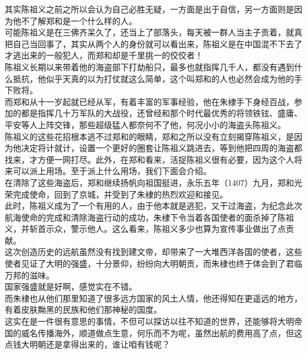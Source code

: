 \begin{multicols}{\theparacolNo}
其实陈祖义之前之所以会认为自己必胜无疑，一方面是出于自信，另一方面则是因为他不了解郑和是一个什么样的人。\\

可能陈祖义是在三佛齐呆久了，还当上了部落头，每天被一群人当主子贡着，就真把自己当回事了，其实从两个人的身份就可以看出来，陈祖义是在中国混不下去了才逃出来的一般犯人，而郑和却是千里挑一的佼佼者！\\

陈祖义长期以来带着他的海盗部下打劫船只，最多也就指挥几千人，都没有遇到什么抵抗，他似乎天真的以为打仗就这么简单，这个叫郑和的人也必然会成为他的手下败将。\\

而郑和从十一岁起就已经从军，有着丰富的军事经验，他在朱棣手下身经百战，参加的都是指挥几十万军队的大战役，还曾经和那个时代最优秀的将领铁铉、盛庸、平安等人上阵交锋，那些超级猛人都奈何不了他，何况小小的海盗头陈祖义。\\

陈祖义的这些花招根本逃不过郑和的眼睛，郑和之所以没有立刻揭穿陈祖义，是因为他决定将计就计，设置一个更好的圈套让陈祖义跳进去，等到他把四周的海盗都找来，才方便一网打尽。此外，在郑和看来，活捉陈祖义很有必要，因为这个人将来可以派上用场。至于派上什么用场，我们下面会介绍。\\

在清除了这些海盗后，郑和继续扬帆向祖国挺进，永乐五年（1407）九月，郑和光荣完成使命，回到了京城，并受到了朱棣的热烈欢迎和接见。\\

此时，陈祖义成为了一个有用的人，由于他本就是逃犯，又干过海盗，为纪念此次航海使命的完成和清除海盗行动的成功，朱棣下令当着各国使者的面杀掉了陈祖义，并斩首示众，警示他人。这么看来，陈祖义多少也算为宣传事业做出了点贡献。\\

这次创造历史的远航虽然没有找到建文帝，却带来了一大堆西洋各国的使者，这些使者见证了大明的强盛，十分景仰，纷纷向大明朝贡，而朱棣也终于体会到了君临万邦的滋味。\\

国家强盛就是好啊，感觉实在不错。\\

而朱棣也从他们那里知道了很多远方国家的风土人情，他还得知在更遥远的地方，有着皮肤黝黑的民族和他们那神秘的国度。\\

这实在是一件很有意思的事情，不但可以探访以往不知道的世界，还能够将大明帝国的威名传播海外，顺道做点生意，何乐而不为呢，虽然出航的费用高了点，但这点钱大明朝还是拿得出来的，谁让咱有钱呢？\\


\end{multicols}
